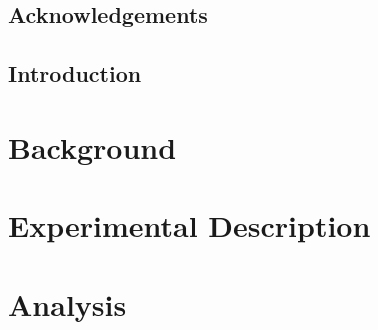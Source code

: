 \documentclass[a4paper,12pt,titlepic]{report}
\begin{document}



\onehalfspacing



\chapter*{Acknowledgements}



\tableofcontents
\listoffigures
{}
\listoftables
{}

\clearpage
\chapter*{Introduction}
\label{chap:Introduction}


\part{Background}
\label{part:bg}





\part{Experimental Description}
\label{part:experiment}




%

\part{Analysis}
\label{part:analysis}





\end{document}
